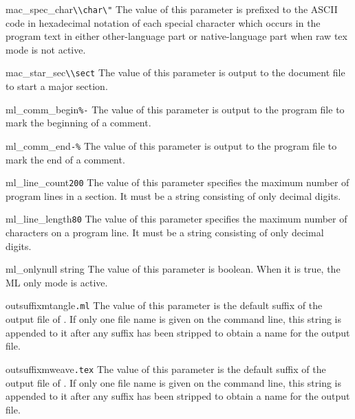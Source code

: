 \begin{describepara}{mac_spec_char}{\verb*|\\char\"|}\describe
The value of this parameter is prefixed to the ASCII code in
hexadecimal notation of each special character which occurs in the program
text in either other-language part or native-language part when raw
tex mode is not active.
\end{describepara}
\begin{describepara}{mac_star_sec}{\verb*|\\sect|}\describe
The value of this parameter is output to the document file to start a
major section.
\end{describepara}
\begin{describepara}{ml_comm_begin}{\verb*|%-|}\describe
The value of this parameter is output to the program file to mark the
beginning of a comment.
\end{describepara}
\begin{describepara}{ml_comm_end}{\verb*|-%|}\describe
The value of this parameter is output to the program file to mark the
end of a comment.
\end{describepara}
\begin{describepara}{ml_line_count}{\verb*|200|}\describe
The value of this parameter specifies the maximum number of program
lines in a section. It must be a string consisting of only decimal digits.
\end{describepara}
\begin{describepara}{ml_line_length}{\verb*|80|}\describe
The value of this parameter specifies the maximum number of characters
on a program line. It must be a string consisting of only decimal digits.
\end{describepara}
\begin{describepara}{ml_only}{null string}\describe
The value of this parameter is boolean. When it is true, the ML
only mode is active.
\end{describepara}
\begin{describepara}{outsuffixmtangle}{\verb*|.ml|}\describe
The value of this parameter is the default suffix of the output file
of \tangle. If only one file name is given on the command line,
this string is appended to it after any suffix has been stripped to
obtain a name for the output file.
\end{describepara}
\begin{describepara}{outsuffixmweave}{\verb*|.tex|}\describe
The value of this parameter is the default suffix of the output file
of \weave. If only one file name is given on the command line,
this string is appended to it after any suffix has been stripped to
obtain a name for the output file.\end{describepara}
